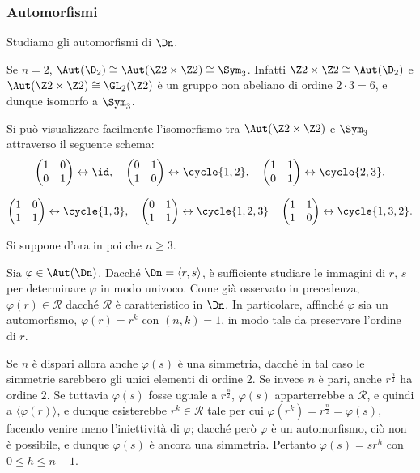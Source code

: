 \documentclass[11pt]{scrartcl}
\begin{document}
	
	\subsubsection{Automorfismi}
	
	Studiamo gli automorfismi di $\Dn$. \medskip
	
	
	Se $n = 2$, $\Aut(\D_2) \cong \Aut(\Z2 \times \Z2) \cong \Sym_3$. Infatti
	$\Z2 \times \Z2 \cong \Aut(\D_2)$ e $\Aut(\Z2 \times \Z2) \cong \GL_2(\Z2)$ è
	un gruppo non abeliano di ordine $2 \cdot 3 = 6$, e dunque isomorfo a $\Sym_3$. \medskip

	Si può visualizzare facilmente l'isomorfismo
	tra $\Aut(\Z2 \times \Z2)$ e $\Sym_3$ attraverso il seguente schema:
	\[
	\begin{pmatrix}1 & 0 \\ 0 & 1\end{pmatrix} \leftrightarrow \id, \quad
	\begin{pmatrix}0 & 1 \\ 1 & 0\end{pmatrix} \leftrightarrow \cycle{1, 2}, \quad
	\begin{pmatrix}1 & 1 \\ 0 & 1\end{pmatrix} \leftrightarrow \cycle{2, 3},
	\]
	
	\[
	\begin{pmatrix}1 & 0 \\ 1 & 1\end{pmatrix} \leftrightarrow \cycle{1, 3}, \quad
	\begin{pmatrix}0 & 1 \\ 1 & 1\end{pmatrix} \leftrightarrow \cycle{1, 2, 3} \quad
	\begin{pmatrix}1 & 1 \\ 1 & 0\end{pmatrix} \leftrightarrow \cycle{1, 3, 2}.
	\] \medskip
	
	Si suppone d'ora in poi che $n \geq 3$. \medskip
 
	Sia $\varphi \in \Aut(\Dn)$. Dacché $\Dn = \langle
	r, s\rangle$, è sufficiente studiare le immagini di $r$, $s$ per determinare
	$\varphi$ in modo univoco. Come già osservato in precedenza, $\varphi(r) \in \mathcal{R}$
	dacché $\mathcal{R}$ è caratteristico in $\Dn$. In particolare, affinché $\varphi$ sia
	un automorfismo, $\varphi(r) = r^k$ con $(n, k) = 1$, in modo tale da preservare l'ordine
	di $r$. \medskip
	
	
	Se $n$ è dispari allora anche $\varphi(s)$ è una simmetria, dacché in tal
	caso le simmetrie sarebbero gli unici elementi di ordine $2$. Se invece $n$ è pari,
	anche $r^{\frac{n}{2}}$ ha ordine $2$. Se tuttavia $\varphi(s)$ fosse uguale
	a $r^{\frac{n}{2}}$, $\varphi(s)$ apparterrebbe a $\mathcal{R}$, e quindi
	a $\langle \varphi(r) \rangle$, e dunque esisterebbe $r^k \in \mathcal{R}$ tale per
	cui $\varphi(r^k) = r^{\frac{n}{2}} = \varphi(s)$, facendo venire meno l'iniettività
	di $\varphi$;
	dacché però $\varphi$ è un automorfismo, ciò non è possibile, e dunque
	$\varphi(s)$ è ancora una simmetria. Pertanto $\varphi(s) = sr^h$ con
	$0 \leq h \leq n-1$. \medskip
\end{document}
